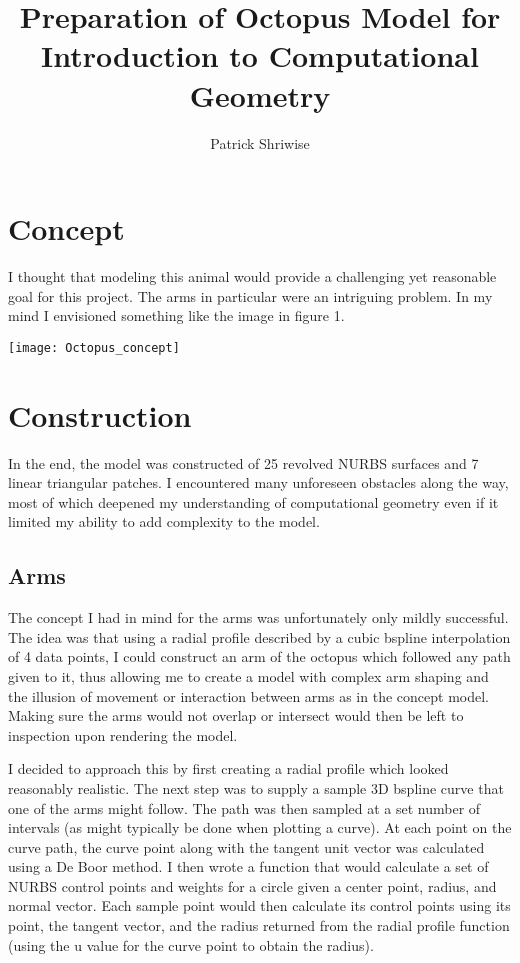 \documentclass[twocolumn]{article}
\begin{document}
\author{Patrick Shriwise}
\title{Preparation of Octopus Model for Introduction to Computational Geometry	}
\maketitle


\section{Concept}

I thought that modeling this animal would provide a challenging yet reasonable goal for this project. The arms in particular were an intriguing problem. In my mind I envisioned something like the image in figure 1. 


\texttt{[image: Octopus\_concept]}


\section{Construction}

In the end, the model was constructed of 25 revolved NURBS surfaces and 7 linear triangular patches. I encountered many unforeseen obstacles along the way, most of which deepened my understanding of computational geometry even if it limited my ability to add complexity to the model. 

\subsection{Arms}

The concept I had in mind for the arms was unfortunately only mildly successful. The idea was that using a radial profile described by a cubic bspline interpolation of 4 data points, I could construct an arm of the octopus which followed any path given to it, thus allowing me to create a model with complex arm shaping and the illusion of movement or interaction between arms as in the concept model. Making sure the arms would not overlap or intersect would then be left to inspection upon rendering the model. 

I decided to approach this by first creating a radial profile which looked reasonably realistic. The next step was to supply a sample 3D bspline curve that one of the arms might follow. The path was then sampled at a set number of intervals (as might typically be done when plotting a curve). At each point on the curve path, the curve point along with the tangent unit vector was calculated using a De Boor method. I then wrote a function that would calculate a set of NURBS control points and weights for a circle given a center point, radius, and normal vector. Each sample point would then calculate its control points using its point, the tangent vector, and the radius returned from the radial profile function (using the u value for the curve point to obtain the radius). 
\end{document}
